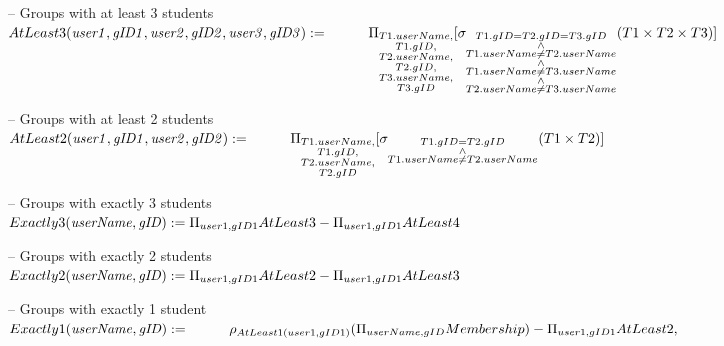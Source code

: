 \documentclass{article}
\newcommand{\var}[1]{\mathit{#1}}
\begin{document}
\begin{enumerate}
{-- Groups with at least 3 students \\[5pt]
$
AtLeast3(\var{user1, gID1, user2, gID2, user3, gID3}) := \\[5pt]
    \hspace*{1cm}
    \Pi_{\substack{T1.userName, \\ T1.gID, \\ T2.userName, \\ T2.gID, \\ T3.userName, \\ T3.gID}}
	[\sigma_{
	    \substack{
	        T1.gID = T2.gID = T3.gID \\
	        \wedge \\
	        T1.userName \neq T2.userName \\
	        \wedge \\
	        T1.userName \neq T3.userName \\
	        \wedge \\
	        T2.userName \neq T3.userName
	    }
	}
	(T1 \times T2 \times T3)] \\[10pt]
$

\newpage

-- Groups with at least 2 students \\[5pt]
$
AtLeast2(\var{user1, gID1, user2, gID2}) := \\[5pt]
    \hspace*{1cm}
    \Pi_{\substack{T1.userName, \\ T1.gID, \\ T2.userName, \\ T2.gID}}
	[\sigma_{
	    \substack{
	        T1.gID = T2.gID \\
	        \wedge \\
	        T1.userName \neq T2.userName
	    }
	}
	(T1 \times T2)] \\[10pt]
$

-- Groups with exactly 3 students \\[5pt]
$
Exactly3(\var{userName, gID}) :=
    \Pi_{user1, gID1} AtLeast3 - \Pi_{user1, gID1} AtLeast4 \\[10pt]
$

-- Groups with exactly 2 students \\[5pt]
$
Exactly2(\var{userName, gID}) :=
    \Pi_{user1, gID1} AtLeast2 - \Pi_{user1, gID1} AtLeast3 \\[10pt]
$

-- Groups with exactly 1 student \\[5pt]
$
Exactly1(\var{userName, gID}) := \\[5pt]
    \hspace*{1cm}
    \rho_{AtLeast1(user1, gID1)}(\Pi_{userName, gID} Membership) - \Pi_{user1, gID1} AtLeast2, \\[10pt]
$

}
\end{enumerate}
\end{document}
